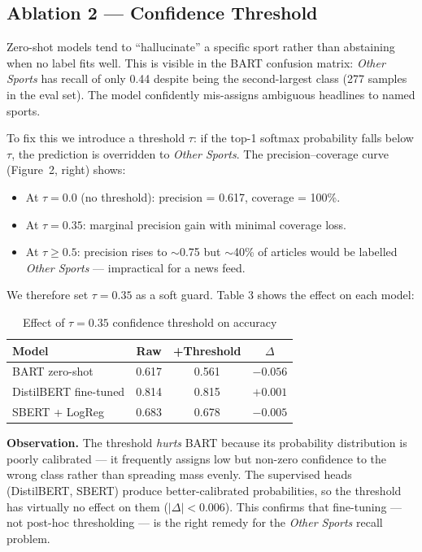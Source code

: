 \documentclass[11pt,a4paper]{article}
\begin{document}
\subsection{Ablation 2 — Confidence Threshold}

Zero-shot models tend to ``hallucinate'' a specific sport rather than
abstaining when no label fits well. This is visible in the BART confusion
matrix: \textit{Other Sports} has recall of only 0.44 despite being the
second-largest class (277 samples in the eval set). The model confidently
mis-assigns ambiguous headlines to named sports.

To fix this we introduce a threshold $\tau$: if the top-1 softmax
probability falls below $\tau$, the prediction is overridden to
\textit{Other Sports}. The precision--coverage curve (Figure~2, right) shows:
\begin{itemize}[noitemsep]
  \item At $\tau=0.0$ (no threshold): precision = 0.617, coverage = 100\%.
  \item At $\tau=0.35$: marginal precision gain with minimal coverage loss.
  \item At $\tau\ge0.5$: precision rises to $\sim$0.75 but $\sim$40\% of
        articles would be labelled \textit{Other Sports} — impractical for a news feed.
\end{itemize}

We therefore set $\tau=0.35$ as a soft guard. Table 3 shows the effect on
each model:

\begin{table}[H]\centering
\caption{Effect of $\tau=0.35$ confidence threshold on accuracy}
\begin{tabular}{lccc}
\toprule
\textbf{Model} & \textbf{Raw} & \textbf{+Threshold} & \textbf{$\Delta$}\\
\midrule
BART zero-shot        & 0.617 & 0.561 & $-0.056$\\
DistilBERT fine-tuned & 0.814 & 0.815 & $+0.001$\\
SBERT + LogReg        & 0.683 & 0.678 & $-0.005$\\
\bottomrule
\end{tabular}
\end{table}

\textbf{Observation.} The threshold \textit{hurts} BART because its
probability distribution is poorly calibrated — it frequently assigns
low but non-zero confidence to the wrong class rather than spreading mass
evenly. The supervised heads (DistilBERT, SBERT) produce better-calibrated
probabilities, so the threshold has virtually no effect on them ($|\Delta| <
0.006$). This confirms that fine-tuning — not post-hoc thresholding — is the
right remedy for the \textit{Other Sports} recall problem.
\end{document}
